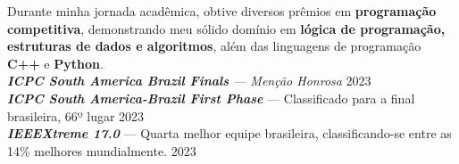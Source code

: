 \begin{CJK}{UTF8}{min}
\vspace*{3pt}
Durante minha jornada acadêmica, obtive diversos prêmios em \textbf{programação competitiva}, demonstrando meu sólido domínio em \textbf{lógica de programação, estruturas de dados e algoritmos}, além das linguagens de programação\textbf{ C++} e \textbf{Python}. \\
\vspace*{7pt}
\textit{\textbf{ICPC South America Brazil Finals} --- Menção Honrosa } \hfill 2023\\

\textit{\textbf{ICPC South America-Brazil First Phase}} --- Classificado para a final brasileira, 66º lugar \hfill 2023\\


\textit{\textbf{IEEEXtreme 17.0}} --- Quarta melhor equipe brasileira, classificando-se entre as 14\% melhores mundialmente. \hfill 2023\\
\end{CJK}

